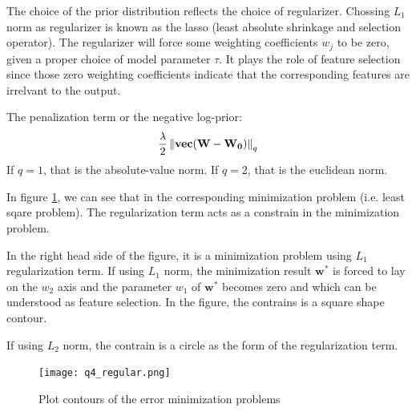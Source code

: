 \documentclass[12pt]{article}
\newenvironment{question}[2][Question]{\begin{trivlist}
\kern10pt
\item[\hskip \labelsep {\bfseries #1}\hskip \labelsep {\bfseries #2.}]}{\end{trivlist}}
\begin{document}
\begin{question}{4}
The choice of the prior distribution reflects the choice of regularizer. 
Chossing $L_1$ norm as regularizer is known as the lasso (least absolute shrinkage and selection operator).
The regularizer will force some weighting coefficients $w_j$ to be zero, given 
a proper choice of model parameter $\tau$. It plays the role of feature selection
since those zero weighting coefficients indicate that the corresponding features
are irrelvant to the output.

The penalization term or the negative log-prior:
\begin{align*}
  \frac{\lambda}{2} \left \|\textbf{vec}(\bf{W} - \bf{W}_0)\right \|_{q}  
\end{align*}
If $q = 1$, that is the absolute-value norm.
If $q = 2$, that is the euclidean norm.

In figure \ref{fig:Q4-min-reg},
we can see that in the corresponding minimization problem (i.e. least sqare problem).
The regularization term acts as a constrain in the minimization problem.

In the right head side of the figure, it is a minimization problem using $L_1$
regularization term.
If using $L_1$ norm, the minimization result $\mathbf{w}^{*}$ is forced to lay on 
the $w_2$ axis and the parameter $w_1$ of $\mathbf{w}^{*}$ becomes zero and which
can be understood as feature selection. In the figure, the contrains is a square
shape contour.

If using $L_2$ norm, the contrain is a circle as the form of the regularization 
term.


\begin{figure}[h!]
  \centering
  \texttt{[image: q4\_regular.png]}
  \caption{Plot contours of the error minimization problems}
  \label{fig:Q4-min-reg}
\end{figure}

\end{question}
\end{document}
